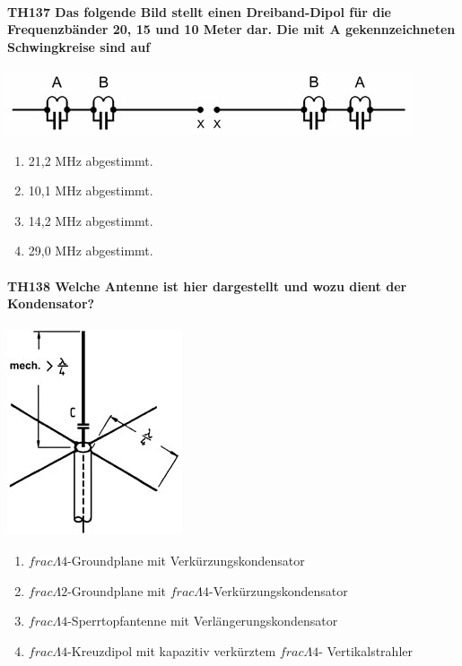 \documentclass[8pt]{article}
\begin{document}
\paragraph*{TH137 Das folgende Bild stellt einen Dreiband-Dipol für die Frequenzbänder 20, 15 und 10 Meter dar. Die mit A gekennzeichneten Schwingkreise sind auf} 
\begin{center}
	\begin{minipage}{\linewidth}
		\centering
		\includegraphics[scale=1.0]{pics/th137_a.jpg}
	\end{minipage}
\end{center}
\begin{enumerate}[nolistsep,label=\Alph*]
\item 21,2 MHz abgestimmt.
\item 10,1 MHz abgestimmt.
\item 14,2 MHz abgestimmt.
\item 29,0 MHz abgestimmt.
\end{enumerate}

\paragraph*{TH138 Welche Antenne ist hier dargestellt und wozu dient der Kondensator?} 
\begin{center}
	\begin{minipage}{\linewidth}
		\centering
		\includegraphics[scale=1.0]{pics/th138_a.jpg}
	\end{minipage}
\end{center}
\begin{enumerate}[nolistsep,label=\Alph*]
\item $frac{\Lambda}{4}$-Groundplane mit Verkürzungskondensator
\item $frac{\Lambda}{2}$-Groundplane mit $frac{\Lambda}{4}$-Verkürzungskondensator
\item $frac{\Lambda}{4}$-Sperrtopfantenne mit Verlängerungskondensator 
\item $frac{\Lambda}{4}$-Kreuzdipol mit kapazitiv verkürztem $frac{\Lambda}{4}$- Vertikalstrahler
\end{enumerate}
\end{document}
